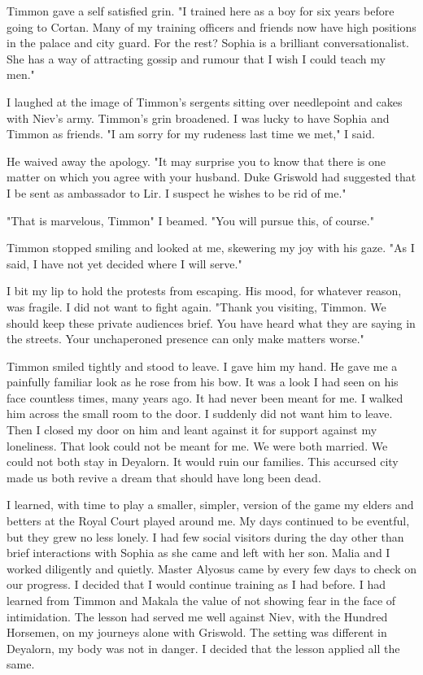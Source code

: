 \documentclass{article}
\begin{document}
Timmon gave a self satisfied grin. "I trained here as a boy for six years before going to Cortan. Many of my training officers and friends now have high positions in the palace and city guard. For the rest? Sophia is a brilliant conversationalist. She has a way of attracting gossip and rumour that I wish I could teach my men."

I laughed at the image of Timmon's sergents sitting over needlepoint and cakes with Niev's army. Timmon's grin broadened. I was lucky to have Sophia and Timmon as friends. "I am sorry for my rudeness last time we met," I said.

He waived away the apology. "It may surprise you to know that there is one matter on which you agree with your husband. Duke Griswold had suggested that I be sent as ambassador to Lir. I suspect he wishes to be rid of me."

"That is marvelous, Timmon" I beamed. "You will pursue this, of course."

Timmon stopped smiling and looked at me, skewering my joy with his gaze. "As I said, I have not yet decided where I will serve."

I bit my lip to hold the protests from escaping. His mood, for whatever reason, was fragile. I did not want to fight again. "Thank you visiting, Timmon. We should keep these private audiences brief. You have heard what they are saying in the streets. Your unchaperoned presence can only make matters worse."

Timmon smiled tightly and stood to leave. I gave him my hand. He gave me a painfully familiar look as he rose from his bow. It was a look I had seen on his face countless times, many years ago. It had never been meant for me. I walked him across the small room to the door. I suddenly did not want him to leave. Then I closed my door on him and leant against it for support against my loneliness. That look could not be meant for me. We were both married. We could not both stay in Deyalorn. It would ruin our families. This accursed city made us both revive a dream that should have long been dead.

\vspace{.5cm}

I learned, with time to play a smaller, simpler, version of the game my elders and betters at the Royal Court played around me. My days continued to be eventful, but they grew no less lonely. I had few social visitors during the day other than brief interactions with Sophia as she came and left with her son. Malia and I worked diligently and quietly. Master Alyosus came by every few days to check on our progress. I decided that I would continue training as I had before. I had learned from Timmon and Makala the value of not showing fear in the face of intimidation. The lesson had served me well against Niev, with the Hundred Horsemen, on my journeys alone with Griswold. The setting was different in Deyalorn, my body was not in danger. I decided that the lesson applied all the same.
\end{document}
